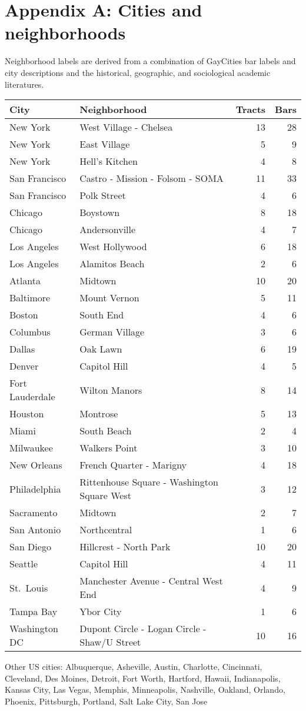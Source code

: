 \newpage

\setlength\parindent{0cm}
\setlength{\parskip}{0.5em}
\setlength\leftskip{0cm}
\linespread{1}\selectfont

\section{Appendix A: Cities and
neighborhoods}\label{appendix-a-cities-and-neighborhoods}

Neighborhood labels are derived from a combination of GayCities bar
labels and city descriptions and the historical, geographic, and
sociological academic literatures.

\begin{longtable}[]{@{}llrr@{}}
\toprule
City & Neighborhood & Tracts & Bars\tabularnewline
\midrule
\endhead
New York & West Village - Chelsea & 13 & 28\tabularnewline
New York & East Village & 5 & 9\tabularnewline
New York & Hell's Kitchen & 4 & 8\tabularnewline
San Francisco & Castro - Mission - Folsom - SOMA & 11 &
33\tabularnewline
San Francisco & Polk Street & 4 & 6\tabularnewline
Chicago & Boystown & 8 & 18\tabularnewline
Chicago & Andersonville & 4 & 7\tabularnewline
Los Angeles & West Hollywood & 6 & 18\tabularnewline
Los Angeles & Alamitos Beach & 2 & 6\tabularnewline
Atlanta & Midtown & 10 & 20\tabularnewline
Baltimore & Mount Vernon & 5 & 11\tabularnewline
Boston & South End & 4 & 6\tabularnewline
Columbus & German Village & 3 & 6\tabularnewline
Dallas & Oak Lawn & 6 & 19\tabularnewline
Denver & Capitol Hill & 4 & 5\tabularnewline
Fort Lauderdale & Wilton Manors & 8 & 14\tabularnewline
Houston & Montrose & 5 & 13\tabularnewline
Miami & South Beach & 2 & 4\tabularnewline
Milwaukee & Walkers Point & 3 & 10\tabularnewline
New Orleans & French Quarter - Marigny & 4 & 18\tabularnewline
Philadelphia & Rittenhouse Square - Washington Square West & 3 &
12\tabularnewline
Sacramento & Midtown & 2 & 7\tabularnewline
San Antonio & Northcentral & 1 & 6\tabularnewline
San Diego & Hillcrest - North Park & 10 & 20\tabularnewline
Seattle & Capitol Hill & 4 & 11\tabularnewline
St.~Louis & Manchester Avenue - Central West End & 4 & 9\tabularnewline
Tampa Bay & Ybor City & 1 & 6\tabularnewline
Washington DC & Dupont Circle - Logan Circle - Shaw/U Street & 10 &
16\tabularnewline
\bottomrule
\end{longtable}

Other US cities: Albuquerque, Asheville, Austin, Charlotte, Cincinnati,
Cleveland, Des Moines, Detroit, Fort Worth, Hartford, Hawaii,
Indianapolis, Kansas City, Las Vegas, Memphis, Minneapolis, Nashville,
Oakland, Orlando, Phoenix, Pittsburgh, Portland, Salt Lake City, San
Jose

